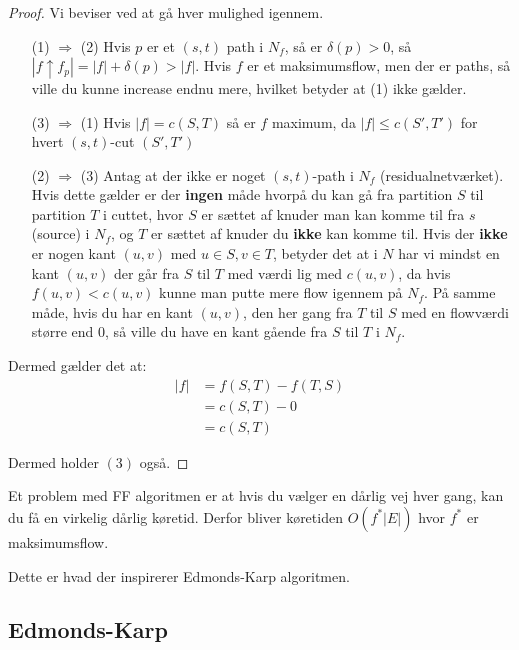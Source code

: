 \documentclass[11pt]{article}
\theoremstyle{definition}
\theoremstyle{remark}
\begin{document}
\begin{proof}

  Vi beviser ved at gå hver mulighed igennem.
\begin{enumerate}
\item[(1) $\Rightarrow$ (2)] Hvis $p$ er et $(s,t)$ path i $N_{f}$, så er $\delta(p) > 0$, så $|f \uparrow f_{p}| = |f| + \delta(p) > |f|$. Hvis $f$ er et maksimumsflow, men der er paths, så ville du kunne increase endnu mere, hvilket betyder at (1) ikke gælder.
\item[(3) $\Rightarrow$ (1)] Hvis $|f| = c(S,T)$ så er $f$ maximum, da $|f| \leq c(S', T')$ for hvert $(s,t)$-cut $(S',T')$
\item[(2) $\Rightarrow$ (3)] Antag at der ikke er noget $(s,t)$-path i $N_{f}$ (residualnetværket). Hvis dette gælder er der \textbf{ingen} måde hvorpå du kan gå fra partition $S$ til partition $T$ i cuttet, hvor $S$ er sættet af knuder man kan komme til fra $s$ (source) i $N_{f}$, og $T$ er sættet af knuder du \textbf{ikke} kan komme til. Hvis der \textbf{ikke} er nogen kant $(u,v)$ med $u \in S, v \in T$, betyder det at i $N$ har vi mindst en kant $(u,v)$ der går fra $S$ til $T$ med værdi lig med $c(u,v)$, da hvis $f(u,v) < c(u,v)$ kunne man putte mere flow igennem på $N_{f}$. På samme måde, hvis du har en kant $(u,v)$, den her gang fra $T$ til $S$ med en flowværdi større end 0, så ville du have en kant gående fra $S$ til $T$ i $N_{f}$.
\end{enumerate}

Dermed gælder det at:
\begin{equation}
  \begin{split}
    |f| &= f(S,T) - f(T,S) \\
        &= c(S,T) - 0 \\
        &= c(S,T)
  \end{split}
\end{equation}

Dermed holder $(3)$ også.
\end{proof}

Et problem med FF algoritmen er at hvis du vælger en dårlig vej hver gang, kan du få en virkelig dårlig køretid. Derfor bliver køretiden $O(f^{*}|E|)$ hvor $f^{*}$ er  maksimumsflow.

Dette er hvad der inspirerer Edmonds-Karp algoritmen.

\subsection{Edmonds-Karp}
\label{subsec:label}
\end{document}
